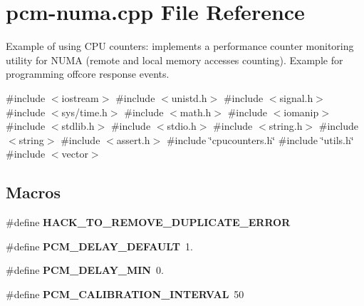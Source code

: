 \hypertarget{pcm-numa_8cpp}{}\section{pcm-\/numa.cpp File Reference}
\label{pcm-numa_8cpp}


Example of using C\+PU counters\+: implements a performance counter monitoring utility for N\+U\+MA (remote and local memory accesses counting). Example for programming offcore response events.  


{\ttfamily \#include $<$iostream$>$}\newline
{\ttfamily \#include $<$unistd.\+h$>$}\newline
{\ttfamily \#include $<$signal.\+h$>$}\newline
{\ttfamily \#include $<$sys/time.\+h$>$}\newline
{\ttfamily \#include $<$math.\+h$>$}\newline
{\ttfamily \#include $<$iomanip$>$}\newline
{\ttfamily \#include $<$stdlib.\+h$>$}\newline
{\ttfamily \#include $<$stdio.\+h$>$}\newline
{\ttfamily \#include $<$string.\+h$>$}\newline
{\ttfamily \#include $<$string$>$}\newline
{\ttfamily \#include $<$assert.\+h$>$}\newline
{\ttfamily \#include \char`\"{}cpucounters.\+h\char`\"{}}\newline
{\ttfamily \#include \char`\"{}utils.\+h\char`\"{}}\newline
{\ttfamily \#include $<$vector$>$}\newline
\subsection*{Macros}
\begin{DoxyCompactItemize}
\item 
\mbox{\label{pcm-numa_8cpp_ac4eeb11d89b0f517835a12a04443ebe4}} 
\#define {\bfseries H\+A\+C\+K\+\_\+\+T\+O\+\_\+\+R\+E\+M\+O\+V\+E\+\_\+\+D\+U\+P\+L\+I\+C\+A\+T\+E\+\_\+\+E\+R\+R\+OR}
\item 
\mbox{\label{pcm-numa_8cpp_aa9ecc55c90c7a69729babc4f5f91ed96}} 
\#define {\bfseries P\+C\+M\+\_\+\+D\+E\+L\+A\+Y\+\_\+\+D\+E\+F\+A\+U\+LT}~1.
\item 
\mbox{\label{pcm-numa_8cpp_acccbe8441d6dd75bdc949f5f0ee126c5}} 
\#define {\bfseries P\+C\+M\+\_\+\+D\+E\+L\+A\+Y\+\_\+\+M\+IN}~0.
\item 
\mbox{\label{pcm-numa_8cpp_a433dde946b6713059756318598c9a6fe}} 
\#define {\bfseries P\+C\+M\+\_\+\+C\+A\+L\+I\+B\+R\+A\+T\+I\+O\+N\+\_\+\+I\+N\+T\+E\+R\+V\+AL}~50
\end{DoxyCompactItemize}
